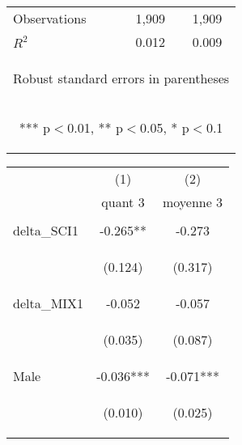 \documentclass{article} %
\begin{document}
\begin{table}[H]
\begin{center}
\begin{tabular}{lcc}
Observations & 1,909 & 1,909 \\
 $R^2$ & 0.012 & 0.009 \\ \hline
\multicolumn{3}{c}{\begin{footnotesize} Robust standard errors in parentheses\end{footnotesize}} \\
\multicolumn{3}{c}{\begin{footnotesize} *** p$<$0.01, ** p$<$0.05, * p$<$0.1\end{footnotesize}} \\
\end{tabular}
\end{center}

\end{table}

\begin{table}[H]
\begin{center}
\begin{tabular}{lcc} \hline
 & (1) & (2) \\
 & quant 3 & moyenne 3 \\ \hline
\vspace{4pt} & \begin{footnotesize}\end{footnotesize} & \begin{footnotesize}\end{footnotesize} \\
delta\_SCI1 & -0.265** & -0.273 \\
\vspace{4pt} & \begin{footnotesize}(0.124)\end{footnotesize} & \begin{footnotesize}(0.317)\end{footnotesize} \\
delta\_MIX1 & -0.052 & -0.057 \\
\vspace{4pt} & \begin{footnotesize}(0.035)\end{footnotesize} & \begin{footnotesize}(0.087)\end{footnotesize} \\
Male & -0.036*** & -0.071*** \\
\vspace{4pt} & \begin{footnotesize}(0.010)\end{footnotesize} & \begin{footnotesize}(0.025)\end{footnotesize} \\

\end{tabular}
\end{center}
\end{table}
\end{document}
